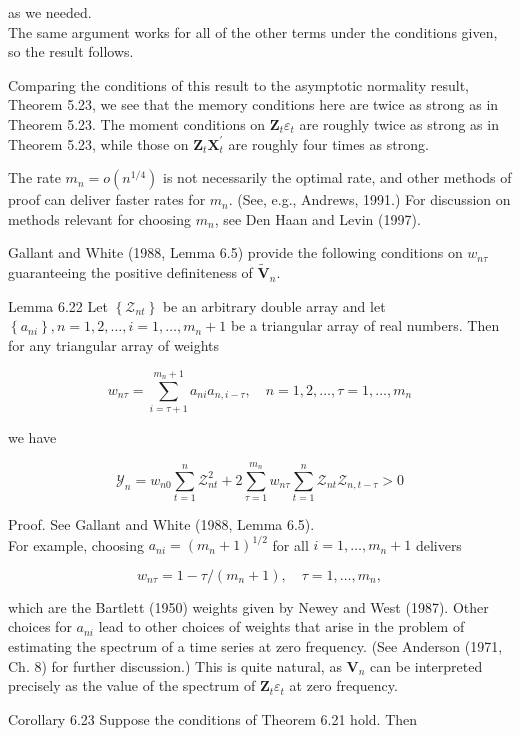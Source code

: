 \documentclass[10pt]{article}
\begin{document}
as we needed.\\
The same argument works for all of the other terms under the conditions given, so the result follows.

Comparing the conditions of this result to the asymptotic normality result, Theorem 5.23, we see that the memory conditions here are twice as strong as in Theorem 5.23. The moment conditions on $\mathbf{Z}_{t} \varepsilon_{t}$ are roughly twice as strong as in Theorem 5.23, while those on $\mathbf{Z}_{t} \mathbf{X}_{t}^{\prime}$ are roughly four times as strong.

The rate $m_{n}=o\left(n^{1 / 4}\right)$ is not necessarily the optimal rate, and other methods of proof can deliver faster rates for $m_{n}$. (See, e.g., Andrews, 1991.) For discussion on methods relevant for choosing $m_{n}$, see Den Haan and Levin (1997).

Gallant and White (1988, Lemma 6.5) provide the following conditions on $w_{n \tau}$ guaranteeing the positive definiteness of $\tilde{\mathbf{V}}_{n}$.

Lemma 6.22 Let $\left\{\mathcal{Z}_{n t}\right\}$ be an arbitrary double array and let $\left\{a_{n i}\right\}, n= 1,2, \ldots, i=1, \ldots, m_{n}+1$ be a triangular array of real numbers. Then for any triangular array of weights

$$
w_{n \tau}=\sum_{i=\tau+1}^{m_{n}+1} a_{n i} a_{n, i-\tau}, \quad n=1,2, \ldots, \tau=1, \ldots, m_{n}
$$

we have

$$
\mathcal{Y}_{n}=w_{n 0} \sum_{t=1}^{n} \mathcal{Z}_{n t}^{2}+2 \sum_{\tau=1}^{m_{n}} w_{n \tau} \sum_{t=1}^{n} \mathcal{Z}_{n t} \mathcal{Z}_{n, t-\tau}>0
$$

Proof. See Gallant and White (1988, Lemma 6.5).\\
For example, choosing $a_{n i}=\left(m_{n}+1\right)^{1 / 2}$ for all $i=1, \ldots, m_{n}+1$ delivers

$$
w_{n \tau}=1-\tau /\left(m_{n}+1\right), \quad \tau=1, \ldots, m_{n},
$$

which are the Bartlett (1950) weights given by Newey and West (1987). Other choices for $a_{n i}$ lead to other choices of weights that arise in the problem of estimating the spectrum of a time series at zero frequency. (See Anderson (1971, Ch. 8) for further discussion.) This is quite natural, as $\mathbf{V}_{n}$ can be interpreted precisely as the value of the spectrum of $\mathbf{Z}_{t} \varepsilon_{t}$ at zero frequency.

Corollary 6.23 Suppose the conditions of Theorem 6.21 hold. Then
\end{document}
